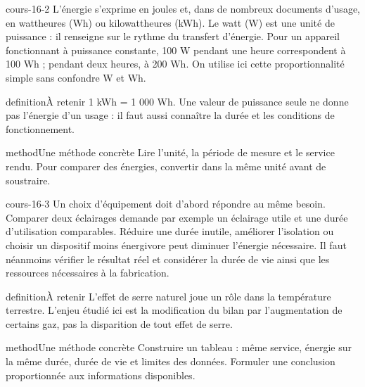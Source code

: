 \documentclass[12pt,twoside,openany]{book}
\begin{document}
\label{ch-16-cours-2}
\begin{pcFiche}{cours-16-2}
L’énergie s’exprime en joules et, dans de nombreux documents d’usage, en wattheures (Wh) ou kilowattheures (kWh). Le watt (W) est une unité de puissance : il renseigne sur le rythme du transfert d’énergie. Pour un appareil fonctionnant à puissance constante, 100 W pendant une heure correspondent à 100 Wh ; pendant deux heures, à 200 Wh. On utilise ici cette proportionnalité simple sans confondre W et Wh.\par
{}
\begin{pcEncadre}{definition}{À retenir}
1 kWh = 1 000 Wh. Une valeur de puissance seule ne donne pas l’énergie d’un usage : il faut aussi connaître la durée et les conditions de fonctionnement.\par
\end{pcEncadre}
\begin{pcEncadre}{method}{Une méthode concrète}
Lire l’unité, la période de mesure et le service rendu. Pour comparer des énergies, convertir dans la même unité avant de soustraire.\par
\end{pcEncadre}
\end{pcFiche}
\label{ch-16-cours-3}
\begin{pcFiche}{cours-16-3}
Un choix d’équipement doit d’abord répondre au même besoin. Comparer deux éclairages demande par exemple un éclairage utile et une durée d’utilisation comparables. Réduire une durée inutile, améliorer l’isolation ou choisir un dispositif moins énergivore peut diminuer l’énergie nécessaire. Il faut néanmoins vérifier le résultat réel et considérer la durée de vie ainsi que les ressources nécessaires à la fabrication.\par
{}
\begin{pcEncadre}{definition}{À retenir}
L’effet de serre naturel joue un rôle dans la température terrestre. L’enjeu étudié ici est la modification du bilan par l’augmentation de certains gaz, pas la disparition de tout effet de serre.\par
\end{pcEncadre}
\begin{pcEncadre}{method}{Une méthode concrète}
Construire un tableau : même service, énergie sur la même durée, durée de vie et limites des données. Formuler une conclusion proportionnée aux informations disponibles.\par
\end{pcEncadre}
\end{pcFiche}
\end{document}
